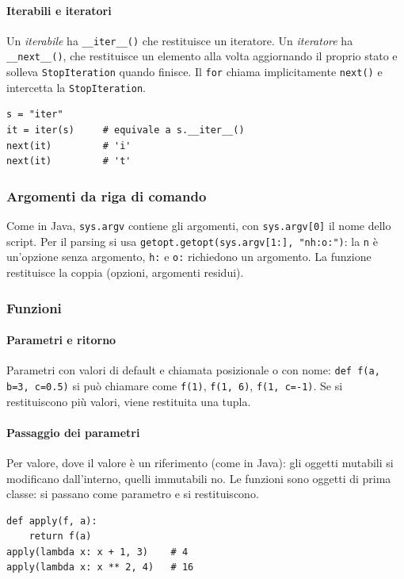 \documentclass[a4paper,12pt]{article}
\begin{document}
\paragraph{Iterabili e iteratori} Un \emph{iterabile} ha \texttt{\_\_iter\_\_()} che
restituisce un iteratore. Un \emph{iteratore} ha \texttt{\_\_next\_\_()}, che restituisce un
elemento alla volta aggiornando il proprio stato e solleva \texttt{StopIteration} quando
finisce. Il \texttt{for} chiama implicitamente \texttt{next()} e intercetta la
\texttt{StopIteration}.
\begin{verbatim}
s = "iter"
it = iter(s)     # equivale a s.__iter__()
next(it)         # 'i'
next(it)         # 't'
\end{verbatim}

\subsubsection{Argomenti da riga di comando}
Come in Java, \texttt{sys.argv} contiene gli argomenti, con \texttt{sys.argv[0]} il nome
dello script. Per il parsing si usa \texttt{getopt.getopt(sys.argv[1:], "nh:o:")}: la
\texttt{n} è un'opzione senza argomento, \texttt{h:} e \texttt{o:} richiedono un argomento.
La funzione restituisce la coppia (opzioni, argomenti residui).

\subsubsection{Funzioni}
\paragraph{Parametri e ritorno} Parametri con valori di default e chiamata posizionale o
con nome: \texttt{def f(a, b=3, c=0.5)} si può chiamare come \texttt{f(1)}, \texttt{f(1, 6)},
\texttt{f(1, c=-1)}. Se si restituiscono più valori, viene restituita una tupla.

\paragraph{Passaggio dei parametri} Per valore, dove il valore è un riferimento (come in
Java): gli oggetti mutabili si modificano dall'interno, quelli immutabili no. Le funzioni
sono oggetti di prima classe: si passano come parametro e si restituiscono.
\begin{verbatim}
def apply(f, a):
    return f(a)
apply(lambda x: x + 1, 3)    # 4
apply(lambda x: x ** 2, 4)   # 16
\end{verbatim}
\end{document}

